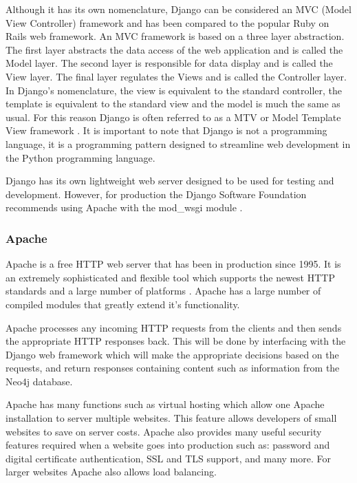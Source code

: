 \documentclass[12pt,onecolumn]{article}
\begin{document}
	Although it has its own nomenclature, Django can be considered an MVC (Model View Controller) framework and has been compared to the popular Ruby on Rails web framework. An MVC framework is based on a three layer abstraction. The first layer abstracts the data access of the web application and is called the Model layer. The second layer is responsible for data display and is called the View layer. The final layer regulates the Views and is called the Controller layer. In Django's nomenclature, the view is equivalent to the standard controller, the template is equivalent to the standard view and the model is much the same as usual. For this reason Django is often referred to as a MTV or Model Template View framework \cite{djangobook}. It is important to note that Django is not a programming language, it is a programming pattern designed to streamline web development in the Python programming language.

	Django has its own lightweight web server designed to be used for testing and development. However, for production the Django Software Foundation recommends using Apache with the mod\_wsgi module \cite{djangoApache}.
	\subsubsection{Apache}

	Apache is a free HTTP web server that has been in production since 1995. It is an extremely sophisticated and flexible tool which supports the newest HTTP standards and a large number of platforms \cite{apache}. Apache has a large number of compiled modules that greatly extend it's functionality. 


	Apache processes any incoming HTTP requests from the clients and then sends the appropriate HTTP responses back. This will be done by interfacing with the Django web framework which will make the appropriate decisions based on the requests, and return responses containing content such as information from the Neo4j database. 

	Apache has many functions such as virtual hosting which allow one Apache installation to server multiple websites. This feature allows developers of small websites to save on server costs. Apache also provides many useful security features required when a website goes into production such as: password and digital certificate authentication, SSL and TLS support, and many more. For larger websites Apache also allows load balancing. 
\end{document}
